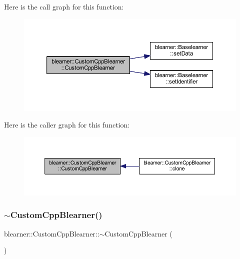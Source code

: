 Here is the call graph for this function\+:\nopagebreak
\begin{figure}[H]
\begin{center}
\leavevmode
\includegraphics[width=350pt]{classblearner_1_1_custom_cpp_blearner_a053eccfff8223ab0358b7f00ed02d263_cgraph}
\end{center}
\end{figure}
Here is the caller graph for this function\+:\nopagebreak
\begin{figure}[H]
\begin{center}
\leavevmode
\includegraphics[width=350pt]{classblearner_1_1_custom_cpp_blearner_a053eccfff8223ab0358b7f00ed02d263_icgraph}
\end{center}
\end{figure}
\mbox{\label{classblearner_1_1_custom_cpp_blearner_a4e26b5c9da2eaff19a21de8fdb534bc5}} 
\subsubsection{\texorpdfstring{$\sim$\+Custom\+Cpp\+Blearner()}{~BaselearnerCustomCpp()}}
{\footnotesize\ttfamily blearner\+::\+Custom\+Cpp\+Blearner\+::$\sim$\+Custom\+Cpp\+Blearner (\begin{DoxyParamCaption}{ }\end{DoxyParamCaption})}



